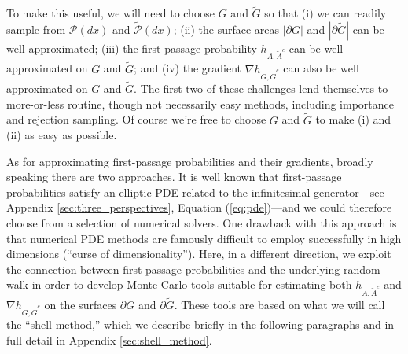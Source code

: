 \documentclass[nofootinbib,english, aip, jcp, priprint, graphicx,floatfix]{revtex4-1}
\theoremstyle{plain}
\theoremstyle{definition}
\theoremstyle{plain}
\newcommand{\PMeasure}{\mathscr{P}(dx)}
\newcommand{\tPMeasure}{\tilde{\mathscr P}(dx)}
\begin{document}
To make this useful, we will need to choose $G$ and $\tilde{G}$ so that (i) we can readily sample from $\PMeasure$ and $\tPMeasure$; (ii) the surface areas $|\partial G|$ and
$|\partial\tilde{G}|$ can be well approximated; (iii) 
the first-passage probability $h_{A, \tilde{A}^c}$ can be well approximated on  $G$ and $\tilde{G}$; and (iv) the gradient
$\nabla h_{G, \tilde{G}^c}$ can also be well approximated on 
 $G$ and $\tilde{G}$. 
The first two of these challenges lend themselves to more-or-less routine, though not necessarily easy methods, including importance and rejection sampling. Of course we're free to choose $G$ and $\tilde G$ to make (i) and (ii) as easy as possible.

As for approximating first-passage probabilities and their gradients, broadly speaking there are two approaches. It is well known that first-passage probabilities satisfy an elliptic PDE related to the infinitesimal generator---see Appendix \ref{sec:three_perspectives}, Equation (\ref{eq:pde})---and we could therefore choose from a selection of numerical solvers. One drawback with this approach is that numerical PDE methods are famously difficult to employ successfully in high dimensions (``curse of dimensionality''). Here, in a different direction, we exploit the connection between first-passage probabilities and the underlying random walk in order to develop Monte Carlo tools suitable for estimating both $h_{A, \tilde{A}^c}$ and $\nabla h_{G, \tilde{G}^c}$ on the surfaces
$\partial G$ and $\partial\tilde{G}$. These tools are based on
what we will call the ``shell method,'' which we describe briefly in the following paragraphs and in full detail in Appendix \ref{sec:shell_method}.
\end{document}
